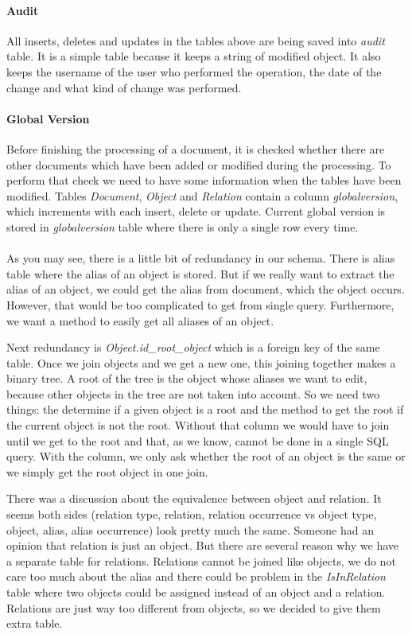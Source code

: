 \paragraph{Audit} All inserts, deletes and updates in the tables above are being
saved into \emph{audit} table. It is a simple table because it keeps a string of
modified object. It also keeps the username of the user who performed the
operation, the date of the change and what kind of change was performed.
 
\paragraph{Global Version} Before finishing the processing of a document, it is
checked whether there are other documents which have been added or modified
during the processing. To perform that check we need to have some information
when the tables have been modified. Tables \emph{Document}, \emph{Object} and
\emph{Relation} contain a column \emph{globalversion}, which increments with
each insert, delete or update. Current global version is stored in
\emph{globalversion} table where there is only a single row every time.

\paragraph{} As you may see, there is a little bit of redundancy in our schema.
There is alias table where the alias of an object is stored. But if we really
want to extract the alias of an object, we could get the alias from document,
which the object occurs. However, that would be too complicated to get from
single query. Furthermore, we want a method to easily get all aliases of an
object.

Next redundancy is \emph{Object.id\_{}root\_{}object} which is a foreign key of
the same table. Once we join objects and we get a new one, this joining together
makes a binary tree. A root of the tree is the object whose aliases we want to
edit, because other objects in the tree are not taken into account. So we need
two things: the determine if a given object is a root and the method to get the
root if the current object is not the root. Without that column we would have to
join until we get to the root and that, as we know, cannot be done in a single
SQL query. With the column, we only ask whether the root of an object is the
same or we simply get the root object in one join.

There was a discussion about the equivalence between object and relation. It
seems both sides (relation type, relation, relation occurrence vs object type,
object, alias, alias occurrence) look pretty much the same. Someone had an
opinion that relation is just an object. But there are several reason why we
have a separate table for relations. Relations cannot be joined like objects, we
do not care too much about the alias and there could be problem in the 
\emph{IsInRelation} table where two objects could be assigned instead of an
object and a relation. Relations are just way too different from objects, so we
decided to give them extra table.

